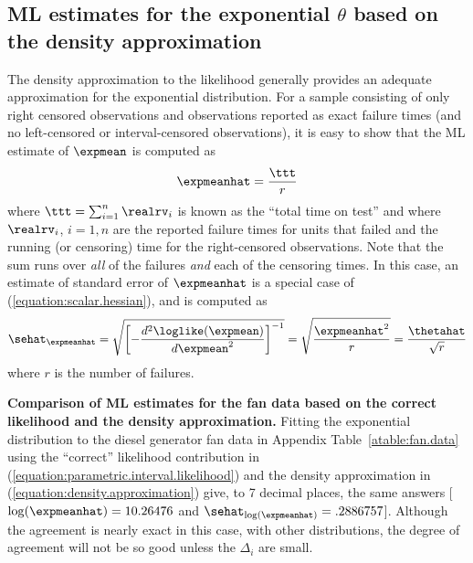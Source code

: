 \subsection{ML estimates for the exponential $\theta$
based on the density approximation} 
\label{section:exponential.density.approx.mle}
The density approximation to the likelihood generally provides an
adequate approximation for the exponential distribution.  For a
sample consisting of only right censored observations and
observations reported as exact failure times (and no left-censored
or interval-censored observations), it is easy to show that the ML
estimate of $\expmean$ is computed as
\begin{equation}
\label{equation:exp.exact.ml}
\expmeanhat=\frac{\ttt}{r}
\end{equation}
where $\ttt=\sum_{i=1}^{n}\realrv_{i}$ is known as the ``total time on test''
and where $\realrv_{i}$, $i=1,n$ are the reported failure times for units 
that failed and
the running (or censoring) time for the right-censored observations.
Note that the sum runs over {\em all} of the failures {\em and}
each of the censoring times. In this case, an estimate of standard error 
of $\expmeanhat$ is a special case of (\ref{equation:scalar.hessian}),
and is computed as
\begin{equation}
\label{equation:sehat.exp.mean}
 \sehat_{\expmeanhat} = 
\sqrt{ \left[-\frac{d^{2} \loglike(\expmean)}
{d \expmean^{2}} \right]^{-1}} = \sqrt{\frac{\expmeanhat^{2}}{r}}
= \frac{\thetahat}{\sqrt{r}} 
\end{equation}
where $r$ is the number of failures.

\begin{example}
{\bf Comparison of ML estimates for the fan data
based on the correct likelihood and
the density approximation.} Fitting the exponential distribution to
the diesel generator fan data in Appendix Table~\ref{atable:fan.data}
using the ``correct'' likelihood contribution in
(\ref{equation:parametric.interval.likelihood}) and the density
approximation in (\ref{equation:density.approximation}) give, to 7
decimal places, the same answers [$\log(\expmeanhat)=10.26476$ and
$\sehat_{\log(\expmeanhat)}=.2886757$]. Although the agreement is
nearly exact in this case, with other distributions, the degree of
agreement will not be so good unless the $\Delta_{i}$ are small.
\end{example}


